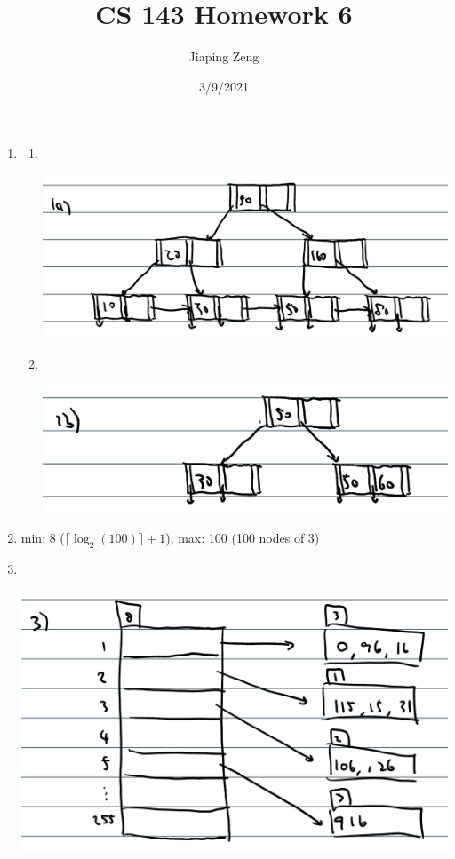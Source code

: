 \documentclass{article}
\title{CS 143 Homework 6}
\date{3/9/2021}
\author{Jiaping Zeng}
\begin{document}
\maketitle

\begin{enumerate}
    \item \begin{enumerate}
              \item $ $
                    \begin{center}
                        \includegraphics[width=5in]{1a.png}
                    \end{center}
              \item $ $
                    \begin{center}
                        \includegraphics[width=5in]{1b.png}
                    \end{center}
          \end{enumerate}
    \item min: 8 ($\lceil\log_2(100)\rceil+1$), max: 100 (100 nodes of 3)
    \item $ $
    \begin{center}
        \includegraphics[width=5in]{3.png}
    \end{center}
\end{enumerate}
\end{document}
